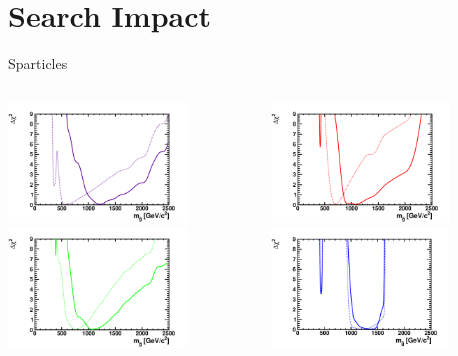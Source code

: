\documentclass{beamer}
\begin{document}
\section{Search Impact}
\begin{frame}{Sparticles}
  \begin{columns}
    \begin{column}{0.5\textwidth}
      \includegraphics[height=3.2cm]{mg/nuhm1.pdf}\vfill 
      \includegraphics[height=3.2cm]{mg/cmssm.pdf}
    \end{column}
    \begin{column}{0.5\textwidth}
      \includegraphics[height=3.2cm]{mg/vcmssm.pdf}\vfill 
      \includegraphics[height=3.2cm]{mg/msugra.pdf}
    \end{column}
  \end{columns}
\end{frame}
\end{document}
